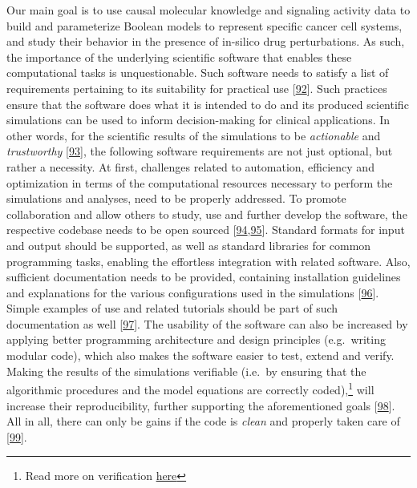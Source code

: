 \documentclass[
  12pt,
]{book}
\begin{document}
Our main goal is to use causal molecular knowledge and signaling activity data to build and parameterize Boolean models to represent specific cancer cell systems, and study their behavior in the presence of in-silico drug perturbations.
As such, the importance of the underlying scientific software that enables these computational tasks is unquestionable.
Such software needs to satisfy a list of requirements pertaining to its suitability for practical use {[}\protect\hyperlink{ref-Wilson2014}{92}{]}.
Such practices ensure that the software does what it is intended to do and its produced scientific simulations can be used to inform decision-making for clinical applications.
In other words, for the scientific results of the simulations to be \emph{actionable} and \emph{trustworthy} {[}\protect\hyperlink{ref-Coveney2021}{93}{]}, the following software requirements are not just optional, but rather a necessity.
At first, challenges related to automation, efficiency and optimization in terms of the computational resources necessary to perform the simulations and analyses, need to be properly addressed.
To promote collaboration and allow others to study, use and further develop the software, the respective codebase needs to be open sourced {[}\protect\hyperlink{ref-Barnes2010}{94},\protect\hyperlink{ref-Prlic2012}{95}{]}.
Standard formats for input and output should be supported, as well as standard libraries for common programming tasks, enabling the effortless integration with related software.
Also, sufficient documentation needs to be provided, containing installation guidelines and explanations for the various configurations used in the simulations {[}\protect\hyperlink{ref-Karimzadeh2018}{96}{]}.
Simple examples of use and related tutorials should be part of such documentation as well {[}\protect\hyperlink{ref-List2017}{97}{]}.
The usability of the software can also be increased by applying better programming architecture and design principles (e.g.~writing modular code), which also makes the software easier to test, extend and verify.
Making the results of the simulations verifiable (i.e.~by ensuring that the algorithmic procedures and the model equations are correctly coded),\footnote{Read more on verification \protect\hyperlink{gtrr}{here}} will increase their reproducibility, further supporting the aforementioned goals {[}\protect\hyperlink{ref-Sandve2013}{98}{]}.
All in all, there can only be gains if the code is \emph{clean} and properly taken care of {[}\protect\hyperlink{ref-Martin2009}{99}{]}.
\end{document}
